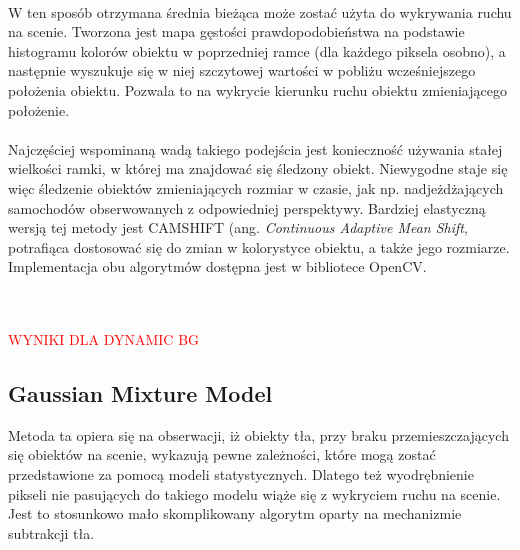 \paragraph{}
W ten sposób otrzymana średnia bieżąca może zostać użyta do wykrywania ruchu na scenie. Tworzona jest mapa gęstości prawdopodobieństwa na podstawie histogramu kolorów obiektu w poprzedniej ramce (dla każdego piksela osobno), a następnie wyszukuje się w niej szczytowej wartości w pobliżu wcześniejszego położenia obiektu. Pozwala to na wykrycie kierunku ruchu obiektu zmieniającego położenie.
\paragraph{}
Najczęściej wspominaną wadą takiego podejścia jest konieczność używania stałej wielkości ramki, w której ma znajdować się śledzony obiekt. Niewygodne staje się więc śledzenie obiektów zmieniających rozmiar w czasie, jak np. nadjeżdżających samochodów obserwowanych z odpowiedniej perspektywy. Bardziej elastyczną wersją tej metody jest CAMSHIFT (ang. \textit{Continuous Adaptive Mean Shift}, potrafiąca dostosować się do zmian w kolorystyce obiektu, a także jego rozmiarze. Implementacja obu algorytmów dostępna jest w bibliotece OpenCV.\\ \\ \\
\begin{LARGE}
\textcolor{red}{WYNIKI DLA DYNAMIC BG}
\end{LARGE}

\subsection{Gaussian Mixture Model}
\label{sec:GMM}
Metoda ta \cite{zivkovic2004improved} opiera się na obserwacji, iż obiekty tła, przy braku przemieszczających się obiektów na scenie, wykazują pewne zależności, które mogą zostać przedstawione za pomocą modeli statystycznych. Dlatego też wyodrębnienie pikseli nie pasujących do takiego modelu wiąże się z wykryciem ruchu na scenie. Jest to stosunkowo mało skomplikowany algorytm oparty na mechanizmie subtrakcji tła.
